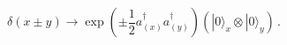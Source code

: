 \begin{equation}
\delta (x \pm y) \rightarrow
\exp\left(\pm\frac{1}{2} a^{\dagger}_{(x)}a^{\dagger}_{(y)}\right)
\left( | 0 \rangle_x \otimes | 0 \rangle_y \right)\,.
\label{eq:squeezed-two}
\end{equation}

